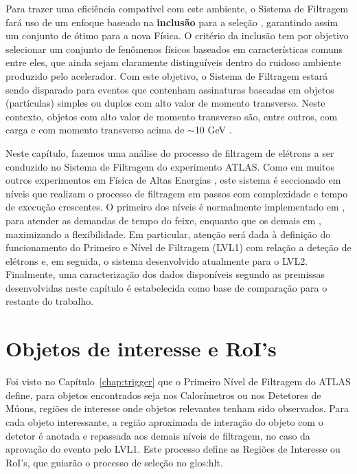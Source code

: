 Para trazer uma eficiência compatível com este ambiente, o Sistema de
Filtragem fará uso de um enfoque baseado na \textbf{inclusão} para a seleção
, garantindo assim um conjunto de  ótimo para a nova
Física. O critério da inclusão tem por objetivo selecionar um conjunto de
fenômenos físicos baseados em características comuns entre eles, que ainda
sejam claramente distinguíveis dentro do ruidoso ambiente produzido pelo
acelerador. Com este objetivo, o Sistema de Filtragem estará sendo disparado
para eventos que contenham assinaturas baseadas em objetos (partículas)
simples ou duplos com alto valor de momento transverso. Neste contexto,
objetos com alto valor de momento transverso são, entre outros, 
com carga e com momento transverso acima de $\sim$10 GeV \cite{hlt-tdr}.

Neste capítulo, fazemos uma análise do processo de filtragem de elétrons a ser
conduzido no Sistema de Filtragem do experimento ATLAS. Como em muitos outros
experimentos em Física de Altas Energias \cite{abolins-calor-2000,
monteiro-calor-1999}, este sistema é seccionado em níveis que realizam o
processo de filtragem em passos com complexidade e tempo de execução
crescentes. O primeiro dos níveis é normalmente implementado em
, para atender as demandas de tempo do feixe, enquanto que os
demais em , maximizando a flexibilidade. Em particular, atenção
será dada à definição do funcionamento do Primeiro e Nível de Filtragem (LVL1)
com relação a deteção de elétrons e, em seguida, o sistema desenvolvido
atualmente para o LVL2. Finalmente, uma caracterização dos dados disponíveis
segundo as premissas desenvolvidas neste capítulo é estabelecida como base de
comparação para o restante do trabalho.

\section{Objetos de interesse e RoI's}

Foi visto no Capítulo~\ref{chap:trigger} que o Primeiro Nível de Filtragem do
ATLAS define, para objetos encontrados seja nos Calorímetros ou nos Detetores
de Múons, regiões de interesse onde objetos relevantes tenham sido
observados. Para cada objeto interessante, a região aproximada de interação do
objeto com o detetor é anotada e repassada aos demais níveis de filtragem, no
caso da aprovação do evento pelo LVL1. Este processo define as Regiões de
Interesse ou RoI's, que guiarão o processo de seleção no \gls{glos:hlt}.

